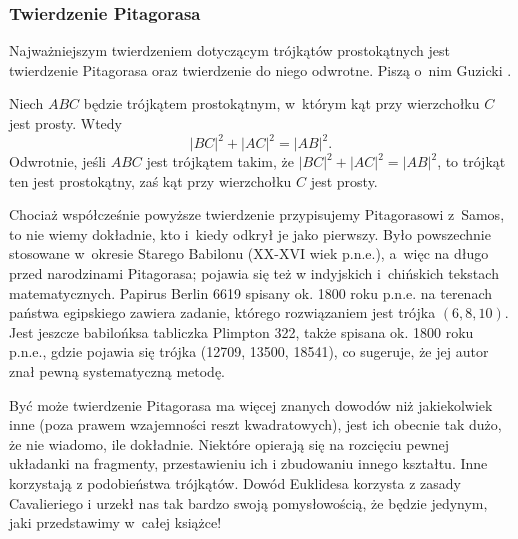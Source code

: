%

\subsubsection{Twierdzenie Pitagorasa}
Najważniejszym twierdzeniem dotyczącym trójkątów prostokątnych jest twierdzenie Pitagorasa oraz twierdzenie do niego odwrotne.
Piszą o~nim Guzicki \cite[s. 160]{guzicki_2021}.


\begin{theorem}[Pitagorasa]
%
\label{theorem_pythagorean}%
    Niech $ABC$ będzie trójkątem prostokątnym, w~którym kąt przy wierzchołku $C$ jest prosty.
    Wtedy
    \begin{equation}
        |BC|^2 + |AC|^2 = |AB|^2.
    \end{equation}
    Odwrotnie, jeśli $ABC$ jest trójkątem takim, że $|BC|^2 + |AC|^2 = |AB|^2$, to trójkąt ten jest prostokątny, zaś kąt przy wierzchołku $C$ jest prosty.
\end{theorem}

Chociaż współcześnie powyższe twierdzenie przypisujemy Pitagorasowi z~Samos, to nie wiemy dokładnie, kto i~kiedy odkrył je jako pierwszy.
%
Było powszechnie stosowane w~okresie Starego Babilonu (XX-XVI wiek p.n.e.), a~więc na długo przed narodzinami Pitagorasa; pojawia się też w indyjskich i~chińskich tekstach matematycznych.
Papirus Berlin 6619 spisany ok. 1800 roku p.n.e. na terenach państwa egipskiego zawiera zadanie, którego rozwiązaniem jest trójka $(6, 8, 10)$.
Jest jeszcze babilońksa tabliczka Plimpton 322, także spisana ok. 1800 roku p.n.e., gdzie pojawia się trójka (12709, 13500, 18541), co sugeruje, że jej autor znał pewną systematyczną metodę.

Być może twierdzenie Pitagorasa ma więcej znanych dowodów niż jakiekolwiek inne (poza prawem wzajemności reszt kwadratowych), jest ich obecnie tak dużo, że nie wiadomo, ile dokładnie.
Niektóre opierają się na rozcięciu pewnej układanki na fragmenty, przestawieniu ich i zbudowaniu innego kształtu.
Inne korzystają z podobieństwa trójkątów.
Dowód Euklidesa korzysta z zasady Cavalieriego i urzekł nas tak bardzo swoją pomysłowością, że będzie jedynym, jaki przedstawimy w~całej książce!

